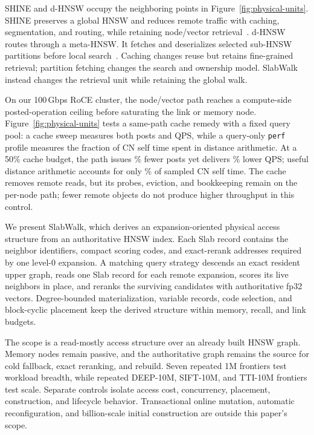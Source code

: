 \documentclass[sigconf,nonacm]{acmart}
\newcommand{\sys}{SlabWalk}
\begin{document}
SHINE and d-HNSW occupy the neighboring points in
Figure~\ref{fig:physical-units}.  SHINE preserves a global HNSW and reduces
remote traffic with caching, segmentation, and routing, while retaining
node/vector retrieval~\cite{shine}.  d-HNSW routes through a meta-HNSW.  It
fetches and deserializes selected sub-HNSW partitions before local
search~\cite{dhnsw}.  Caching changes reuse but retains fine-grained retrieval;
partition fetching changes the search and ownership model.  SlabWalk instead
changes the retrieval unit while retaining the global walk.

On our 100\,Gbps RoCE cluster, the node/vector path reaches a compute-side
posted-operation ceiling before saturating the link or memory node.
Figure~\ref{fig:physical-units} tests a same-path cache remedy with a
fixed query pool: a cache sweep measures both posts and QPS, while a
query-only \texttt{perf} profile measures the fraction of CN self time spent in
distance arithmetic.  At a 50\% cache budget, the path issues
\ClaimCachePostReduction\% fewer posts yet delivers \ClaimCacheQpsLoss\%
lower QPS; useful distance arithmetic accounts for only
\ClaimProfileDistanceShare\%
of sampled CN self time.  The cache removes remote reads, but its probes,
eviction, and bookkeeping remain on the per-node path; fewer remote objects do
not produce higher throughput in this control.

We present \sys{}, which derives an expansion-oriented physical access
structure from an authoritative HNSW index.  Each Slab record contains the neighbor identifiers, compact scoring
codes, and exact-rerank addresses required by one level-0 expansion.  A
matching query strategy descends an exact resident upper graph, reads one Slab
record for each remote expansion, scores its live neighbors in place, and
reranks the surviving candidates with authoritative fp32 vectors.  Degree-bounded
materialization, variable records, code selection, and block-cyclic placement
keep the derived structure within memory, recall, and link budgets.

The scope is a read-mostly access structure over an already built HNSW graph.
Memory nodes remain passive, and the authoritative graph remains the source
for cold fallback, exact reranking, and rebuild.  Seven repeated 1M frontiers
test workload breadth, while repeated DEEP-10M, SIFT-10M, and TTI-10M
frontiers test scale.  Separate controls isolate access cost, concurrency,
placement, construction, and lifecycle behavior.
Transactional online mutation, automatic reconfiguration, and billion-scale
initial construction are outside this paper's scope.
\end{document}
